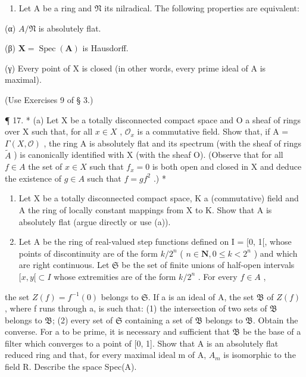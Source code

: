 \begin{enumerate}
\def\labelenumi{(\alph{enumi})}
\setcounter{enumi}{3}
\tightlist
\item
  Let A be a ring and \(\mathfrak{N}\) its nilradical. The following properties are equivalent:
\end{enumerate}

(α) \(A/\mathfrak{N}\) is absolutely flat.

(β) \(\mathbf{X} = \operatorname{Spec}(\mathbf{A})\) is Hausdorff.

(γ) Every point of X is closed (in other words, every prime ideal of A is maximal).

(Use Exercises 9 of § 3.)

¶ 17. * (a) Let X be a totally disconnected compact space and O a sheaf of rings over X such that, for all \(x \in X\) , \(\mathcal{O}_x\) is a commutative field. Show that, if A = \(\Gamma(X, \mathcal{O})\) , the ring A is absolutely flat and its spectrum (with the sheaf of rings \(\tilde{A}\) ) is canonically identified with X (with the sheaf O). (Observe that for all \(f \in A\) the set of \(x \in X\) such that \(f_x = 0\) is both open and closed in X and deduce the existence of \(g \in A\) such that \(f = gf^2\) .) *

\begin{enumerate}
\def\labelenumi{(\alph{enumi})}
\setcounter{enumi}{1}
\item
  Let X be a totally disconnected compact space, K a (commutative) field and A the ring of locally constant mappings from X to K. Show that A is absolutely flat (argue directly or use (a)).
\item
  Let A be the ring of real-valued step functions defined on I = {[}0, 1{[}, whose points of discontinuity are of the form \(k/2^n\) ( \(n \in \mathbf{N}, 0 \leqslant k < 2^n\) ) and which are right continuous. Let \(\mathfrak{S}\) be the set of finite unions of half-open intervals \([x, y[ \subset I\) whose extremities are of the form \(k/2^n\) . For every \(f \in A\) ,
\end{enumerate}

the set \(Z(f) = f^{-1}(0)\) belongs to \(\mathfrak{S}\). If a is an ideal of A, the set \(\mathfrak{B}\) of \(Z(f)\) , where f runs through a, is such that: (1) the intersection of two sets of \(\mathfrak{B}\) belongs to \(\mathfrak{B}\); (2) every set of \(\mathfrak{S}\) containing a set of \(\mathfrak{B}\) belongs to \(\mathfrak{B}\). Obtain the converse. For a to be prime, it is necessary and sufficient that \(\mathfrak{B}\) be the base of a filter which converges to a point of {[}0, 1{]}. Show that A is an absolutely flat reduced ring and that, for every maximal ideal m of A, \(A_{m}\) is isomorphic to the field R. Describe the space Spec(A).

